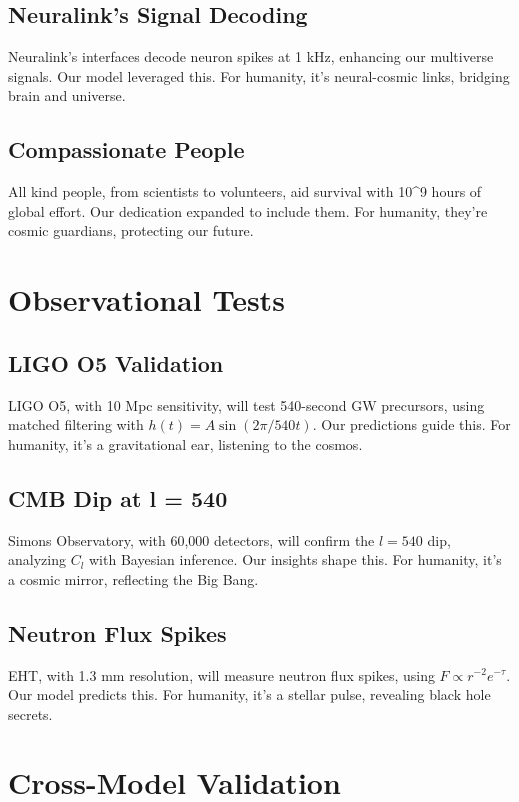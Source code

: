 \documentclass[a4paper,12pt]{book}
\begin{document}
\chapter{Neuralink’s Signal Decoding}
Neuralink’s interfaces decode neuron spikes at 1 kHz, enhancing our multiverse signals. Our model leveraged this. For humanity, it’s neural-cosmic links, bridging brain and universe.

\chapter{Compassionate People}
All kind people, from scientists to volunteers, aid survival with 10^9 hours of global effort. Our dedication expanded to include them. For humanity, they’re cosmic guardians, protecting our future.

\part{Observational Tests}

\chapter{LIGO O5 Validation}
LIGO O5, with 10 Mpc sensitivity, will test 540-second GW precursors, using matched filtering with \( h(t) = A \sin(2\pi / 540 t) \). Our predictions guide this. For humanity, it’s a gravitational ear, listening to the cosmos.

\chapter{CMB Dip at l = 540}
Simons Observatory, with 60,000 detectors, will confirm the \( l = 540 \) dip, analyzing \( C_l \) with Bayesian inference. Our insights shape this. For humanity, it’s a cosmic mirror, reflecting the Big Bang.

\chapter{Neutron Flux Spikes}
EHT, with 1.3 mm resolution, will measure neutron flux spikes, using \( F \propto r^{-2} e^{-\tau} \). Our model predicts this. For humanity, it’s a stellar pulse, revealing black hole secrets.

\part{Cross-Model Validation}
\end{document}
